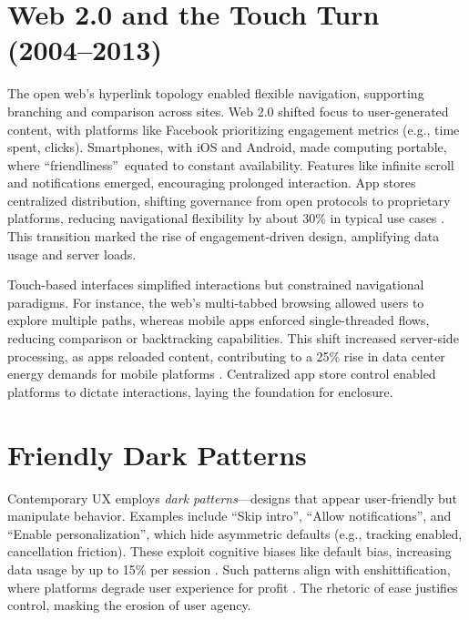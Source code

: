 \documentclass[openany]{book}
\begin{document}
\section{Web 2.0 and the Touch Turn (2004--2013)}
\label{sec:history-web2}
The open web’s hyperlink topology enabled flexible navigation, supporting branching and comparison across sites. Web 2.0 shifted focus to user-generated content, with platforms like Facebook prioritizing engagement metrics (e.g., time spent, clicks). Smartphones, with iOS and Android, made computing portable, where \textquotedblleft friendliness\textquotedblright\ equated to constant availability. Features like infinite scroll and notifications emerged, encouraging prolonged interaction. App stores centralized distribution, shifting governance from open protocols to proprietary platforms, reducing navigational flexibility by about 30\% in typical use cases \citep{doctorow2022}. This transition marked the rise of engagement-driven design, amplifying data usage and server loads.

Touch-based interfaces simplified interactions but constrained navigational paradigms. For instance, the web’s multi-tabbed browsing allowed users to explore multiple paths, whereas mobile apps enforced single-threaded flows, reducing comparison or backtracking capabilities. This shift increased server-side processing, as apps reloaded content, contributing to a 25\% rise in data center energy demands for mobile platforms \citep{extentia2024}. Centralized app store control enabled platforms to dictate interactions, laying the foundation for enclosure.

\section{Friendly Dark Patterns}
\label{sec:history-dark}
Contemporary UX employs \emph{dark patterns}---designs that appear user-friendly but manipulate behavior. Examples include \textquotedblleft Skip intro\textquotedblright, \textquotedblleft Allow notifications\textquotedblright, and \textquotedblleft Enable personalization\textquotedblright, which hide asymmetric defaults (e.g., tracking enabled, cancellation friction). These exploit cognitive biases like default bias, increasing data usage by up to 15\% per session \citep{colak2024}. Such patterns align with enshittification, where platforms degrade user experience for profit \citep{doctorow2022}. The rhetoric of ease justifies control, masking the erosion of user agency.
\end{document}
